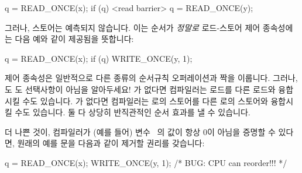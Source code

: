 \fi

\begin{VerbatimN}
q = READ_ONCE(x);
if (q) {
	<read barrier>
	q = READ_ONCE(y);
}
\end{VerbatimN}

그러나, 스토어는 예측되지 않습니다.
이는 순서가 \emph{정말로} 로드-스토어 제어 종속성에는 다음 예와 같이 제공됨을
뜻합니다:

\begin{VerbatimN}
q = READ_ONCE(x);
if (q)
	WRITE_ONCE(y, 1);
\end{VerbatimN}

제어 종속성은 일반적으로 다른 종류의 순서규칙 오퍼레이션과 짝을 이룹니다.
그러나,  도  도 선택사항이 아님을 알아두세요!
 가 없다면 컴파일러는  로드를 다른  로드와 융합시킬
수도 있습니다.
 가 없다면 컴파일러는  로의 스토어를 다른  로의
스토어와 융합시킬 수도 있습니다.
둘 다 상당히 반직관적인 순서 효과를 낼 수 있습니다.

더 나쁜 것이, 컴파일러가 (예를 들어) 변수~ 의 값이 항상 0이 아님을 증명할
수 있다면, 원래의 예를  문을 다음과 같이 제거할 권리를 갖습니다:

\begin{VerbatimN}
q = READ_ONCE(x);
WRITE_ONCE(y, 1); /* BUG: CPU can reorder!!! */
\end{VerbatimN}

